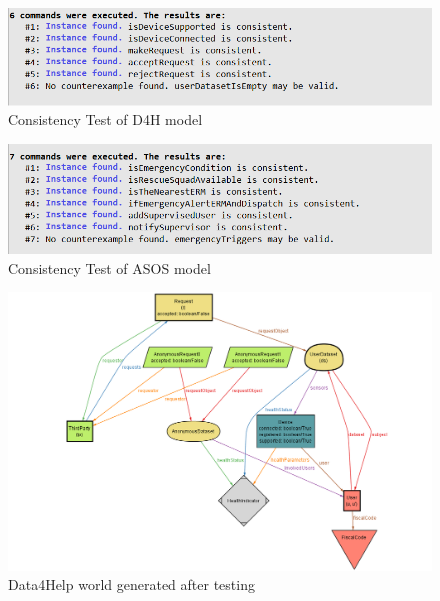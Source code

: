\begin{figure}[htp!]
	\includegraphics[scale=0.8]{Images/alloy/D4H_consistency.png}
	\captionsetup{justification=raggedright, singlelinecheck=false}
	\vspace*{-2mm}\caption{Consistency Test of D4H model}
	\label{figure17}
\end{figure}
\begin{figure}[htp!]
	\includegraphics[scale=0.8]{Images/alloy/ASOS_consistency.png}
	\captionsetup{justification=raggedright, singlelinecheck=false}
	\vspace*{-2mm}\caption{Consistency Test of ASOS model}
	\label{figure18}
\end{figure}
\newpage
{}
\begin{figure}[H]
	\includegraphics[scale=0.42]{Images/alloy/D4H_world.png}
	\vspace*{-3mm}\caption{Data4Help world generated after testing}
	\label{figure19}
\end{figure}


